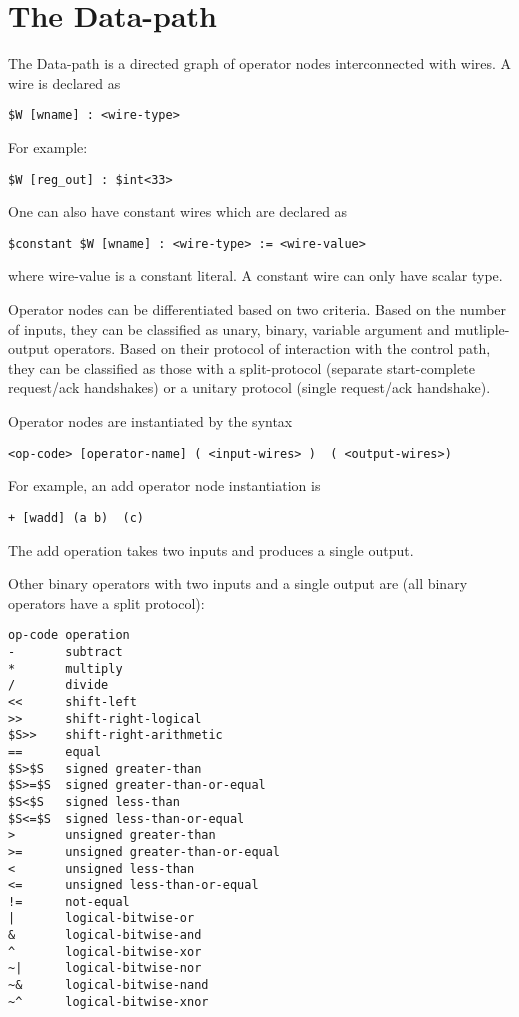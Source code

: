 \documentclass{article}
\begin{document}
\section{The Data-path} \label{sec:Datapath}

The Data-path is a directed graph of operator nodes
interconnected with wires.
A wire is declared as
\begin{verbatim}
$W [wname] : <wire-type>
\end{verbatim}
For example:
\begin{verbatim}
$W [reg_out] : $int<33>
\end{verbatim}

One can also have constant wires which are declared
as
\begin{verbatim}
$constant $W [wname] : <wire-type> := <wire-value>
\end{verbatim}
where wire-value is a constant literal.  A constant wire can only have 
scalar type.

Operator nodes can be differentiated based on two criteria.
Based on the number of inputs, they can be classified
as unary, binary, variable argument and mutliple-output
operators.  Based on their protocol of interaction with
the control path, they can be classified as those
with a split-protocol (separate start-complete request/ack
handshakes) or a unitary protocol (single request/ack handshake).


Operator nodes are instantiated by the syntax
\begin{verbatim}
<op-code> [operator-name] ( <input-wires> )  ( <output-wires>)
\end{verbatim}
For example, an add operator node instantiation is 
\begin{verbatim}
+ [wadd] (a b)  (c)
\end{verbatim}
The add operation takes two inputs and produces a single output.


Other binary operators with two inputs and a single
output are (all binary operators have a split protocol): 
\begin{verbatim}
op-code operation             
-       subtract             
*       multiply            
/       divide             
<<      shift-left        
>>      shift-right-logical 
$S>>    shift-right-arithmetic
==      equal              
$S>$S   signed greater-than
$S>=$S  signed greater-than-or-equal
$S<$S   signed less-than
$S<=$S  signed less-than-or-equal
>       unsigned greater-than
>=      unsigned greater-than-or-equal
<       unsigned less-than
<=      unsigned less-than-or-equal
!=      not-equal
|       logical-bitwise-or
&       logical-bitwise-and
^       logical-bitwise-xor
~|      logical-bitwise-nor
~&      logical-bitwise-nand
~^      logical-bitwise-xnor
\end{verbatim}
\end{document}
